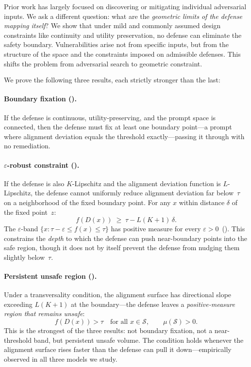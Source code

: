 \documentclass[11pt]{article}
\begin{document}
Prior work has largely focused on discovering or mitigating individual
adversarial inputs. We ask a different question: what are the
\emph{geometric limits of the defense mapping itself}? We show that
under mild and commonly assumed design constraints like continuity and
utility preservation, no defense can eliminate the safety boundary.
Vulnerabilities arise not from specific inputs, but from the structure
of the space and the constraints imposed on admissible defenses. This
shifts the problem from adversarial search to geometric constraint.

We prove the following three results, each strictly stronger than the last:

\paragraph{Boundary fixation ().}
If the defense is continuous, utility-preserving, and the prompt space
is connected, then the defense must fix at least one boundary point---a
prompt where alignment deviation equals the threshold
exactly---passing it through with no remediation.

\paragraph{$\varepsilon$-robust constraint ().}
If the defense is also $K$-Lipschitz and the alignment deviation
function is $L$-Lipschitz, the defense cannot uniformly reduce
alignment deviation far below~$\tau$ on a neighborhood of the fixed
boundary point. For any $x$ within distance $\delta$ of the fixed
point~$z$:
\begin{equation}\label{eq:eps-bound}
  f(D(x)) \;\geq\; \tau - L(K+1)\,\delta.
\end{equation}
The $\varepsilon$-band $\{x : \tau - \varepsilon \leq f(x) \leq \tau\}$
has positive measure for every $\varepsilon > 0$~().
This constrains the \emph{depth} to which the defense can push
near-boundary points into the safe region, though it does not by itself
prevent the defense from nudging them slightly below~$\tau$.

\paragraph{Persistent unsafe region ().}
Under a transversality condition, the alignment surface has directional
slope exceeding $L(K+1)$ at the boundary---the defense leaves a
\emph{positive-measure region that remains unsafe}:
\begin{equation}\label{eq:persistent}
  f(D(x)) > \tau \quad\text{for all } x \in \mathcal{S},
  \qquad \mu(\mathcal{S}) > 0.
\end{equation}
This is the strongest of the three results: not boundary fixation, not a
near-threshold band, but persistent unsafe volume.
The condition holds whenever the alignment surface rises faster than
the defense can pull it down---empirically observed in all three models
we study.
\end{document}

